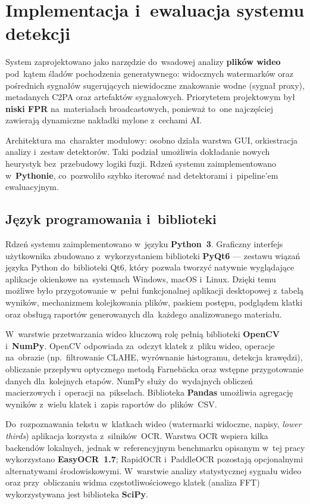 \chapter{Implementacja i~ewaluacja systemu detekcji}

System zaprojektowano jako narzędzie do~wsadowej analizy \textbf{plików wideo}
pod~kątem śladów pochodzenia generatywnego: widocznych watermarków oraz pośrednich
sygnałów sugerujących niewidoczne znakowanie wodne (sygnał proxy),
metadanych C2PA oraz artefaktów sygnałowych. Priorytetem projektowym był
\textbf{niski FPR} na~materiałach broadcastowych, ponieważ to~one najczęściej
zawierają dynamiczne nakładki mylone z~cechami AI.

Architektura ma~charakter modułowy: osobno działa warstwa GUI, orkiestracja
analizy i~zestaw detektorów. Taki podział umożliwia dokładanie nowych heurystyk
bez~przebudowy logiki fuzji. Rdzeń systemu zaimplementowano w~\textbf{Pythonie},
co~pozwoliło szybko iterować nad detektorami i~pipeline'em ewaluacyjnym.

\section{Język programowania i~biblioteki}

Rdzeń systemu zaimplementowano w~języku \textbf{Python~3}.
Graficzny interfejs użytkownika zbudowano z~wykorzystaniem biblioteki \textbf{PyQt6} ---
zestawu wiązań języka Python do~biblioteki Qt6, który pozwala tworzyć
natywnie wyglądające aplikacje okienkowe na~systemach Windows, macOS i~Linux.
Dzięki temu możliwe było przygotowanie w~pełni funkcjonalnej aplikacji desktopowej
z~tabelą wyników, mechanizmem kolejkowania plików, paskiem postępu,
podglądem klatki oraz obsługą raportów generowanych dla~każdego
analizowanego materiału.

W~warstwie przetwarzania wideo kluczową rolę pełnią biblioteki \textbf{OpenCV}
i~\textbf{NumPy}. OpenCV odpowiada za~odczyt klatek z~pliku wideo, operacje na~obrazie
(np.\ filtrowanie CLAHE, wyrównanie histogramu, detekcja krawędzi),
obliczanie przepływu optycznego metodą Farnebäcka oraz wstępne przygotowanie
danych dla~kolejnych etapów. NumPy służy do~wydajnych obliczeń
macierzowych i~operacji na~pikselach. Biblioteka \textbf{Pandas} umożliwia
agregację wyników z~wielu klatek i~zapis raportów do~plików~CSV.

Do~rozpoznawania tekstu w~klatkach wideo (watermarki widoczne, napisy,
\textit{lower thirds}) aplikacja korzysta z~silników~OCR.
Warstwa OCR wspiera kilka backendów lokalnych, jednak w~referencyjnym
benchmarku opisanym w~tej pracy wykorzystano \textbf{EasyOCR~1.7};
RapidOCR i~PaddleOCR pozostają opcjonalnymi alternatywami środowiskowymi.
W~warstwie analizy statystycznej sygnału wideo oraz przy~obliczaniu widma
częstotliwościowego klatek (analiza FFT) wykorzystywana jest biblioteka
\textbf{SciPy}.

